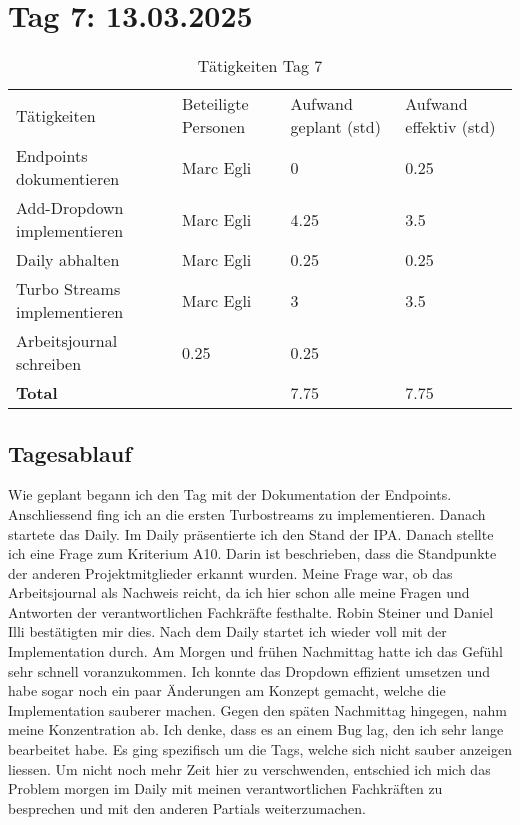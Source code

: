 \section{Tag 7: 13.03.2025}
\begin{table}[H]
    \begin{tabular}{|L{0.4\textwidth}|C{60pt}|C{60pt}|C{60pt}|}
        \hline
        \color{white}Tätigkeiten & \color{white}Beteiligte \color{white}Personen & \color{white}Aufwand geplant (std) & \color{white}Aufwand effektiv (std) \\
        Endpoints dokumentieren & Marc Egli & 0 & 0.25 \\
        \hline
        Add-Dropdown implementieren & Marc Egli & 4.25 & 3.5 \\
        \hline
        Daily abhalten & Marc Egli & 0.25 & 0.25 \\
        \hline
        Turbo Streams implementieren & Marc Egli & 3 & 3.5 \\
        \hline
        Arbeitsjournal schreiben & 0.25 & 0.25 \\
        \textbf{Total} &  & 7.75 & 7.75 \\
        \hline
    \end{tabular}
    \caption{Tätigkeiten Tag 7}
\end{table}

\subsection*{Tagesablauf}
Wie geplant begann ich den Tag mit der Dokumentation der Endpoints. Anschliessend fing ich an die ersten Turbostreams zu implementieren.
Danach startete das Daily. Im Daily präsentierte ich den Stand der IPA. Danach stellte ich eine Frage zum Kriterium A10. Darin ist beschrieben, dass die Standpunkte der
anderen Projektmitglieder erkannt wurden. Meine Frage war, ob das Arbeitsjournal als Nachweis reicht, da ich hier schon alle meine Fragen und Antworten der verantwortlichen 
Fachkräfte festhalte. Robin Steiner und Daniel Illi bestätigten mir dies. Nach dem Daily startet ich wieder voll mit der Implementation durch. 
Am Morgen und frühen Nachmittag hatte ich das Gefühl sehr schnell voranzukommen. Ich konnte das Dropdown effizient umsetzen und habe sogar noch ein paar Änderungen am Konzept gemacht,
welche die Implementation sauberer machen. Gegen den späten Nachmittag hingegen, nahm meine Konzentration ab. Ich denke, dass es an einem Bug lag, den ich sehr lange
bearbeitet habe. Es ging spezifisch um die Tags, welche sich nicht sauber anzeigen liessen. Um nicht noch mehr Zeit hier zu verschwenden, entschied ich mich
das Problem morgen im Daily mit meinen verantwortlichen Fachkräften zu besprechen und mit den anderen Partials weiterzumachen. 


